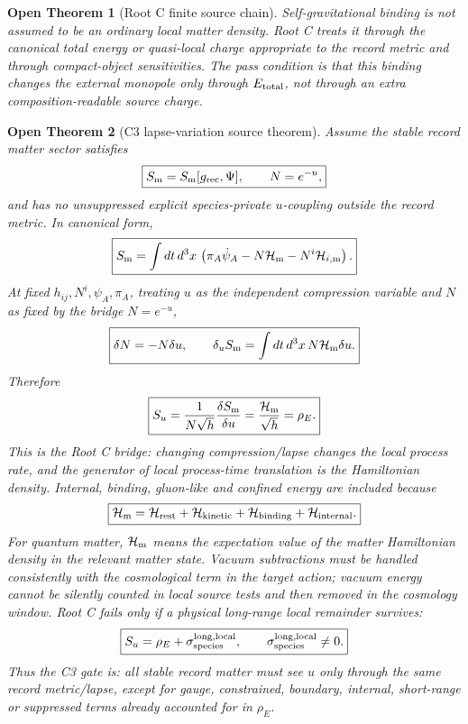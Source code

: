 \documentclass[11pt]{article}
\newtheorem{openthm}{Open Theorem}
\begin{document}
\begin{openthm}[Root C finite source chain]
Self-gravitational binding is not assumed to be an ordinary local matter
density.  Root C treats it through the canonical total energy or quasi-local
charge appropriate to the record metric and through compact-object
sensitivities.  The pass condition is that this binding changes the external
monopole only through \(E_{\rm total}\), not through an extra
composition-readable source charge.
\end{openthm}

\begin{openthm}[C3 lapse-variation source theorem]
Assume the stable record matter sector satisfies
\[
\boxed{
S_{\rm m}=S_{\rm m}[g_{\rm rec},\Psi],
\qquad
N=e^{-u},
}
\]
and has no unsuppressed explicit species-private \(u\)-coupling outside the
record metric.  In canonical form,
\[
\boxed{
S_{\rm m}
=
\int dt\,d^3x\,
\left(
\pi_A\dot\psi_A
-N\mathcal H_{\rm m}
-N^i\mathcal H_{i,\rm m}
\right).
}
\]
At fixed \(h_{ij},N^i,\psi_A,\pi_A\), treating \(u\) as the independent
compression variable and \(N\) as fixed by the bridge \(N=e^{-u}\),
\[
\boxed{
\delta N=-N\delta u,
\qquad
\delta_uS_{\rm m}
=
\int dt\,d^3x\,N\mathcal H_{\rm m}\delta u.
}
\]
Therefore
\[
\boxed{
S_u
=
\frac{1}{N\sqrt h}\frac{\delta S_{\rm m}}{\delta u}
=
\frac{\mathcal H_{\rm m}}{\sqrt h}
=
\rho_E.
}
\]
This is the Root C bridge: changing compression/lapse changes the local
process rate, and the generator of local process-time translation is the
Hamiltonian density.  Internal, binding, gluon-like and confined energy are
included because
\[
\boxed{
\mathcal H_{\rm m}
=
\mathcal H_{\rm rest}
+\mathcal H_{\rm kinetic}
+\mathcal H_{\rm binding}
+\mathcal H_{\rm internal}.
}
\]
For quantum matter, \(\mathcal H_{\rm m}\) means the expectation value of the
matter Hamiltonian density in the relevant matter state.  Vacuum subtractions
must be handled consistently with the cosmological term in the target action;
vacuum energy cannot be silently counted in local source tests and then
removed in the cosmology window.
Root C fails only if a physical long-range local remainder survives:
\[
\boxed{
S_u=\rho_E+\sigma_{\rm species}^{\rm long,local},
\qquad
\sigma_{\rm species}^{\rm long,local}\neq0.
}
\]
Thus the C3 gate is: all stable record matter must see \(u\) only through the
same record metric/lapse, except for gauge, constrained, boundary, internal,
short-range or suppressed terms already accounted for in \(\rho_E\).
\end{openthm}
\end{document}
